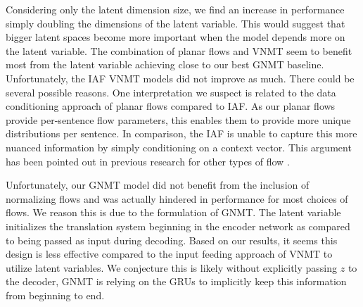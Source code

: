 Considering only the latent dimension size, we find an increase in performance simply doubling the dimensions of the latent variable. This would suggest that bigger latent spaces become more important when the model depends more on the latent variable. The combination of planar flows and \ac{VNMT} seem to benefit most from the latent variable achieving close to our best \ac{GNMT} baseline. Unfortunately, the \ac{IAF} \ac{VNMT} models did not improve as much. There could be several possible reasons. One interpretation we suspect is related to the data conditioning approach of planar flows compared to \ac{IAF}. As our planar flows provide per-sentence flow parameters, this enables them to provide more unique distributions per sentence. In comparison, the \ac{IAF} is unable to capture this more nuanced information by simply conditioning on a context vector. This argument has been pointed out in previous research for other types of flow \cite{Berg2018SylvesterNF}.

Unfortunately, our \ac{GNMT} model did not benefit from the inclusion of normalizing flows and was actually hindered in performance for most choices of flows. We reason this is due to the formulation of \ac{GNMT}. The latent variable initializes the translation system beginning in the encoder network as compared to being passed as input during decoding. Based on our results, it seems this design is less effective compared to the input feeding approach of \ac{VNMT} to utilize latent variables. We conjecture this is likely without explicitly passing $z$ to the decoder, \ac{GNMT} is relying on the \ac{GRU}s to implicitly keep this information from beginning to end. 


